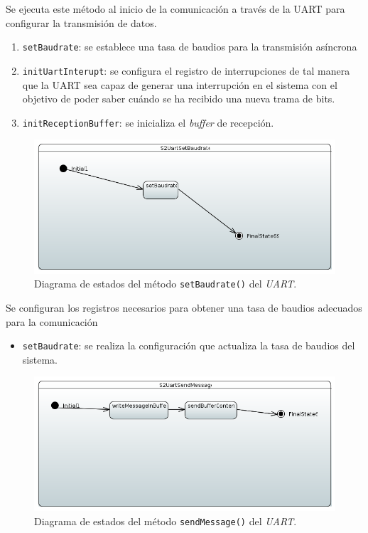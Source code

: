Se ejecuta este método al inicio de la comunicación a través de la \ac{UART} para configurar la transmisión de datos.

\begin{enumerate}
    \item \texttt{setBaudrate}: se establece una tasa de baudios para la transmisión asíncrona
    \item \texttt{initUartInterupt}: se configura el registro de interrupciones de tal manera que la \ac{UART} sea capaz de generar una interrupción en el sistema con el objetivo de poder saber cuándo se ha recibido una nueva trama de bits.
    \item \texttt{initReceptionBuffer}: se inicializa el \textit{buffer} de recepción.
\end{enumerate}

\begin{figure}[H]
    \centering
    \includegraphics[width=1\linewidth]{pictures/S2UartSetBaudrate.PNG}
    \caption{Diagrama de estados del método \texttt{setBaudrate()} del \textit{UART}.}
    \label{fig:fun_set_baudrate_uart}
\end{figure}

Se configuran los registros necesarios para obtener una tasa de baudios adecuados para la comunicación

\begin{itemize}
    \item \texttt{setBaudrate}: se realiza la configuración que actualiza la tasa de baudios del sistema.
\end{itemize}

\begin{figure}[H]
    \centering
    \includegraphics[width=1\linewidth]{pictures/S2UartSendMessage.PNG}
    \caption{Diagrama de estados del método \texttt{sendMessage()} del \textit{UART}.}
    \label{fig:fun_send_message_uart}
\end{figure}

